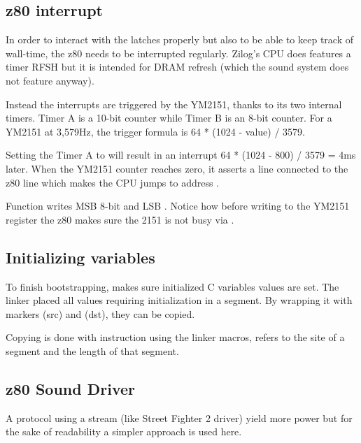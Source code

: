 \subsection{z80 interrupt}
In order to interact with the latches properly but also to be able to keep track of wall-time, the z80 needs to be interrupted regularly. Zilog's CPU does features a timer RFSH but it is intended for DRAM refresh (which the sound system does not feature anyway).

Instead the interrupts are triggered by the YM2151, thanks to its two internal timers. Timer A is a 10-bit counter while Timer B is an 8-bit counter. For a YM2151 at 3,579Hz, the trigger formula is 64 * (1024 - value) / 3579.

Setting the Timer A to  will result in an interrupt 64 * (1024 - 800) / 3579 = 4ms later. When the YM2151 counter reaches zero, it asserts a line connected to the z80  line which makes the CPU jumps to address .



Function  writes MSB 8-bit  and LSB . Notice how before writing to the YM2151 register the z80 makes sure the 2151 is not busy via .





\subsection{Initializing variables}
To finish bootstrapping,  makes sure initialized C variables values are set. The linker placed all values requiring initialization in a  segment. By wrapping it with markers  (src) and  (dst), they can be copied.



Copying is done with  instruction using the linker macros,  refers to the site of a segment and  the length of that segment.


 



\subsection{z80 Sound Driver}
A protocol using a stream (like Street Fighter 2 driver) yield more power but for the sake of readability a simpler approach is used here.



